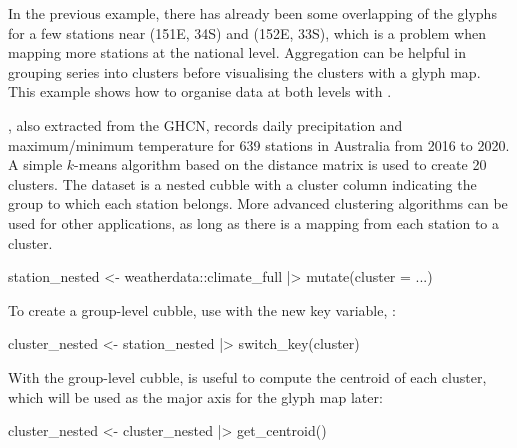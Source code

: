 \documentclass{article}
\newenvironment{Shaded}{\begin{snugshade}}{\end{snugshade}}
\newcommand{\AttributeTok}[1]{\textcolor[rgb]{0.77,0.63,0.00}{#1}}
\newcommand{\FunctionTok}[1]{\textcolor[rgb]{0.00,0.00,0.00}{#1}}
\newcommand{\NormalTok}[1]{#1}
\newcommand{\OtherTok}[1]{\textcolor[rgb]{0.56,0.35,0.01}{#1}}
\newcommand{\SpecialCharTok}[1]{\textcolor[rgb]{0.00,0.00,0.00}{#1}}
\begin{document}
In the previous example, there has already been some overlapping of the glyphs for a few stations near (151E, 34S) and (152E, 33S), which is a problem when mapping more stations at the national level. Aggregation can be helpful in grouping series into clusters before visualising the clusters with a glyph map. This example shows how to organise data at both levels with .

, also extracted from the GHCN, records daily precipitation and maximum/minimum temperature for 639 stations in Australia from 2016 to 2020. A simple \(k\)-means algorithm based on the distance matrix is used to create 20 clusters. The dataset  is a nested cubble with a cluster column indicating the group to which each station belongs. More advanced clustering algorithms can be used for other applications, as long as there is a mapping from each station to a cluster.

\begin{Shaded}
\begin{Highlighting}[]
\NormalTok{station\_nested }\OtherTok{\textless{}{-}}\NormalTok{ weatherdata}\SpecialCharTok{::}\NormalTok{climate\_full }\SpecialCharTok{|\textgreater{}}
  \FunctionTok{mutate}\NormalTok{(}\AttributeTok{cluster =}\NormalTok{ ...)}
\end{Highlighting}
\end{Shaded}

To create a group-level cubble, use  with the new key variable, :

\begin{Shaded}
\begin{Highlighting}[]
\NormalTok{cluster\_nested }\OtherTok{\textless{}{-}}\NormalTok{ station\_nested }\SpecialCharTok{|\textgreater{}} \FunctionTok{switch\_key}\NormalTok{(cluster)}
\end{Highlighting}
\end{Shaded}

With the group-level cubble,  is useful to compute the centroid of each cluster, which will be used as the major axis for the glyph map later:

\begin{Shaded}
\begin{Highlighting}[]
\NormalTok{cluster\_nested }\OtherTok{\textless{}{-}}\NormalTok{ cluster\_nested }\SpecialCharTok{|\textgreater{}} \FunctionTok{get\_centroid}\NormalTok{()}
\end{Highlighting}
\end{Shaded}
\end{document}
